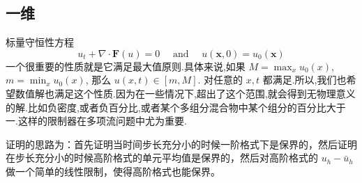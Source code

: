 \documentclass{book}
\begin{document}
\begin{example}
\begin{example}{}{}
\begin{example}
\begin{example}
\begin{example}
\subsection{一维}
\cite{RN6}
标量守恒性方程
\begin{equation}
    u_{t}+\nabla \cdot \mathbf{F}(u)=0 \quad \text { and } \quad u(\mathbf{x}, 0)=u_{0}(\mathbf{x})
\end{equation}
一个很重要的性质就是它满足最大值原则.具体来说,如果 $M=\max_x u_0(x)$,$m=\min_x u_0(x)$, 那么 $u(x,t)\in[m,M]$. 对任意的 $x,t$ 都满足.所以,我们也希望数值解也满足这个性质.因为在一些情况下,超出了这个范围,就会得到无物理意义的解.比如负密度,或者负百分比,或者某个多组分混合物中某个组分的百分比大于一.这样的限制器在多项流问题中尤为重要.\cite{PP-review}

证明的思路为：首先证明当时间步长充分小的时候一阶格式下是保界的，然后证明在步长充分小的时候高阶格式的单元平均值是保界的，然后对高阶格式的 $u_h-\bar{u}_h$ 做一个简单的线性限制，使得高阶格式也能保界。


\end{example}
\end{example}
\end{example}
\end{example}
\end{example}
\end{document}
